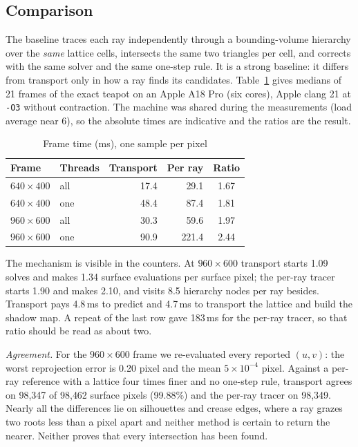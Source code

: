 \documentclass[journal]{IEEEtran}
\begin{document}
\subsection{Comparison}

The baseline traces each ray independently through a bounding-volume
hierarchy over the \emph{same} lattice cells, intersects the same two
triangles per cell, and corrects with the same solver and the same
one-step rule. It is a strong baseline: it differs from transport only in
how a ray finds its candidates. Table~\ref{tab:render} gives medians of
21 frames of the exact teapot on an Apple A18 Pro (six cores), Apple
clang 21 at \texttt{-O3} without contraction. The machine was shared
during the measurements (load average near 6), so the absolute times are
indicative and the ratios are the result.

\begin{table}[H]
\caption{Frame time (ms), one sample per pixel}
\label{tab:render}
\centering
\scriptsize
\begin{tabular}{ll|rr|c}
\hline
Frame & Threads & Transport & Per ray & Ratio\\
\hline
$640\times400$ & all & 17.4 & 29.1 & 1.67\\
$640\times400$ & one & 48.4 & 87.4 & 1.81\\
$960\times600$ & all & 30.3 & 59.6 & 1.97\\
$960\times600$ & one & 90.9 & 221.4 & 2.44\\
\hline
\end{tabular}
\end{table}

The mechanism is visible in the counters. At $960\times600$ transport
starts 1.09 solves and makes 1.34 surface evaluations per surface pixel;
the per-ray tracer starts 1.90 and makes 2.10, and visits 8.5 hierarchy
nodes per ray besides. Transport pays 4.8\,ms to predict and 4.7\,ms to
transport the lattice and build the shadow map. A repeat of the last row
gave 183\,ms for the per-ray tracer, so that ratio should be read as
about two.

\emph{Agreement.} For the $960\times600$ frame we re-evaluated every
reported $(u,v)$: the worst reprojection error is 0.20 pixel and the mean
$5\times10^{-4}$ pixel. Against a per-ray reference with a lattice four
times finer and no one-step rule, transport agrees on 98{,}347 of 98{,}462
surface pixels (99.88\%) and the per-ray tracer on 98{,}349. Nearly all
the differences lie on silhouettes and crease edges, where a ray grazes
two roots less than a pixel apart and neither method is certain to return
the nearer. Neither proves that every intersection has been found.
\end{document}
